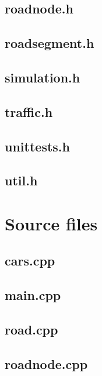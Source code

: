 \documentclass{article}
\begin{document}
  \subsection{roadnode.h}
    
  \subsection{roadsegment.h}
    
  \subsection{simulation.h}
    
  \subsection{traffic.h}
    
  \subsection{unittests.h}
    
  \subsection{util.h}
    
\section{Source files}
  \subsection{cars.cpp}
    
  \subsection{main.cpp}
    
  \subsection{road.cpp}
    
  \subsection{roadnode.cpp}
    
\end{document}
